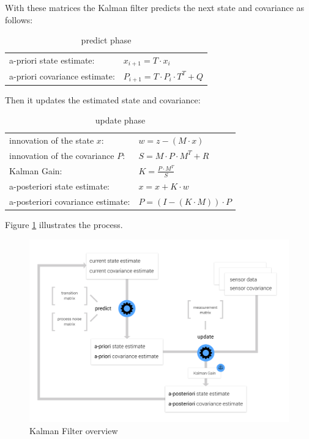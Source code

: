 With these matrices the Kalman filter predicts the next state and covariance as follows:
\begin{table}[ht]
\begin{center}
\begin{tabular}{l l}
a-priori state estimate: & $x_{i+1} = T \cdot x_i$ \\
a-priori covariance estimate: & $P_{i+1} = T \cdot P_i \cdot T^T + Q$\\
\end{tabular}
\caption*{predict phase}
\end{center}
\end{table}

Then it updates the estimated state and covariance:

\begin{table}[ht]
\begin{center}
\begin{tabular}{l l}
innovation of the state $x$: & $w = z - (M \cdot x)$\\
innovation of the covariance $P$: & $S = M \cdot P \cdot M^T + R$\\
Kalman Gain: & $K = \frac{P \cdot M^T}{S}$\\
a-posteriori state estimate: & $x = x + K \cdot w$ \\
a-posteriori covariance estimate: & $P = (I - (K \cdot M)) \cdot P$\\
\end{tabular}
\caption*{update phase}
\end{center}
\end{table}

Figure \ref{kalman} illustrates the process.

\begin{figure}[ht]
\centering
\includegraphics[width=\textwidth]{graphics/Kalman-Filter.png}
\caption{Kalman Filter overview}
\label{kalman}
\centering
\end{figure}

